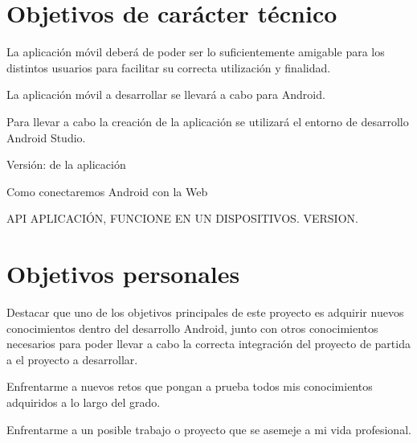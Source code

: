 \section{Objetivos de carácter técnico}

La aplicación móvil deberá de poder ser lo suficientemente amigable para los distintos usuarios para facilitar su correcta utilización y finalidad.

La aplicación móvil a desarrollar se llevará a cabo para Android.

Para llevar a cabo la creación de la aplicación se utilizará el entorno de desarrollo Android Studio.

Versión: de la aplicación

Como conectaremos Android con la Web

API APLICACIÓN, FUNCIONE EN UN DISPOSITIVOS. VERSION.

\section{Objetivos personales}

Destacar que uno de los objetivos principales de este proyecto es adquirir nuevos conocimientos dentro del desarrollo Android, junto con otros conocimientos necesarios para poder llevar a cabo la correcta integración del proyecto de partida a el proyecto a desarrollar.

Enfrentarme a nuevos retos que pongan a prueba todos mis conocimientos adquiridos a lo largo del grado.

Enfrentarme a un posible trabajo o proyecto que se asemeje a mi vida profesional.



















